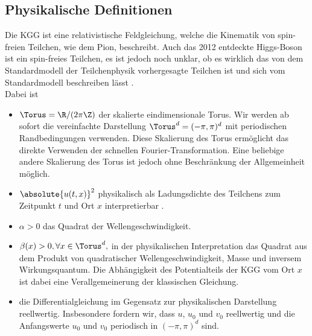 \subsection{Physikalische Definitionen}
Die KGG ist eine relativistische Feldgleichung, welche die Kinematik von spin-freien Teilchen, wie dem Pion, beschreibt. Auch das 2012 entdeckte Higgs-Boson ist ein spin-freies Teilchen, es ist jedoch noch unklar, ob es wirklich das von dem Standardmodell der Teilchenphysik vorhergesagte Teilchen ist und sich vom Standardmodell beschreiben lässt \autocite{cern2016}.\\
Dabei ist
\begin{itemize}
\item $\Torus=\R/(2\pi\Z)$ der skalierte eindimensionale Torus. Wir werden ab sofort die vereinfachte Darstellung $\Torus^d=(-\pi,\pi)^d$ mit periodischen Randbedingungen verwenden. Diese Skalierung des Torus ermöglicht das direkte Verwenden der schnellen Fourier-Transformation. Eine beliebige andere Skalierung des Torus ist jedoch ohne Beschränkung der Allgemeinheit möglich.
\item $\absolute{u(t,x)}^2$ physikalisch als Ladungsdichte des Teilchens zum Zeitpunkt $t$ und Ort $x$ interpretierbar \autocite{kleingordon2016}. 
\item $\alpha>0$ das Quadrat der Wellengeschwindigkeit.
\item $\beta(x)>0, \forall x\in \Torus^d,$ in der physikalischen Interpretation das Quadrat aus dem Produkt von quadratischer Wellengeschwindigkeit, Masse und inversem  Wirkungsquantum. Die Abhängigkeit des Potentialteils der KGG vom Ort $x$ ist dabei eine Verallgemeinerung der klassischen Gleichung.
\item die Differentialgleichung im Gegensatz zur physikalischen Darstellung reellwertig. Insbesondere fordern wir, dass $u$, $u_0$ und $v_0$ reellwertig und die Anfangswerte $u_0$ und $v_0$ periodisch in $(-\pi,\pi)^d$ sind.
\end{itemize}

